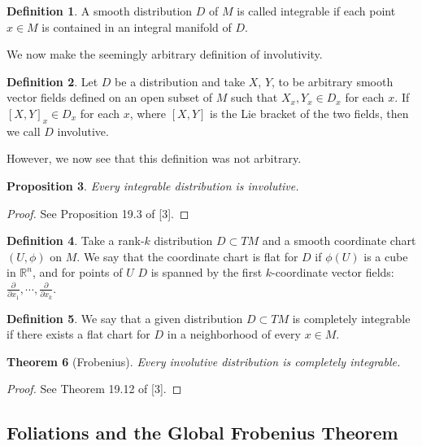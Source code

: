 \documentclass[psamsfonts,12pt]{amsart}
\newcommand\0{\mathbf{0}}
\theoremstyle{plain}
\newtheorem{thm}{Theorem}[section] %
\newtheorem{prop}[thm]{Proposition}
\theoremstyle{definition}
\newtheorem{dfn}[thm]{Definition} %
\newcommand{\bbR}{\mathbb{R}}
\begin{document}
\begin{dfn}
A smooth distribution $D$ of $M$ is called integrable if each point $x\in M$ is contained in an integral manifold of $D$.
\end{dfn}

We now make the seemingly arbitrary definition of involutivity.

\begin{dfn}
Let $D$ be a distribution and take $X$, $Y$,  to be arbitrary smooth vector fields defined on an open subset of $M$ such that $X_x,Y_x\in D_x$ for each $x$.  If $[X,Y]_x \in D_x$ for each $x$, where $[X,Y]$ is the Lie bracket of the two fields, then we call $D$ involutive.
\end{dfn}

However, we now see that this definition was not arbitrary.

\begin{prop}
Every integrable distribution is involutive.
\end{prop}
\begin{proof}
See Proposition 19.3 of [3].
\end{proof}

\begin{dfn}
Take a rank-$k$ distribution $D\subset TM$ and a smooth coordinate chart $(U,\phi)$ on $M$.  We say that the coordinate chart is flat for $D$ if $\phi(U)$ is a cube in $\bbR^n$, and for points of $U$ $D$ is spanned by the first $k$-coordinate vector fields: $\frac{\partial}{\partial x_1},\cdots,\frac{\partial}{\partial x_k}$.
\end{dfn}

\begin{dfn}
We say that a given distribution $D\subset TM$ is completely integrable if there exists a flat chart for $D$ in a neighborhood of every $x\in M$.
\end{dfn}

\begin{thm}[Frobenius]
Every involutive distribution is completely integrable.
\end{thm}
\begin{proof}
See Theorem 19.12 of [3].
\end{proof}



\subsection{Foliations and the Global Frobenius Theorem}
\end{document}
